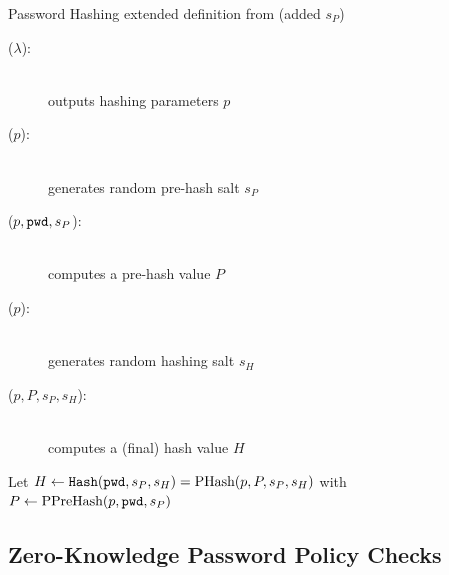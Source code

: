 \documentclass[notes,xcolor=dvipsnames]{beamer}
\begin{document}
\begin{frame}{Password Hashing}
  extended definition from \cite{BenhamoudaP13} (added $s_P$)
  \begin{description}
    \item[\PSetup($\lambda$):] \hfill\\ outputs hashing parameters $p$
    \item[\PPHSalt($p$):] \hfill\\	generates random pre-hash salt $s_P$
    \item[\PPreHash($p, \mathtt{pwd}, s_P$):] \hfill\\	computes a pre-hash value $P$
    \item[\PHSalt($p$):] \hfill\\ generates random hashing salt $s_H$
    \item[\PHash($p, P, s_P, s_H$):]	\hfill\\ computes a (final) hash value $H$
  \end{description}
  Let $H\gets\mathtt{Hash}(\mathtt{pwd}, s_P, s_H)=\text{PHash}(p, P, s_P, s_H)$ with $P\gets\text{PPreHash}(p, \mathtt{pwd}, s_P)$
\end{frame}

\subsection[ZKPPC]{Zero-Knowledge Password Policy Checks}

%   
%   
\end{document}
